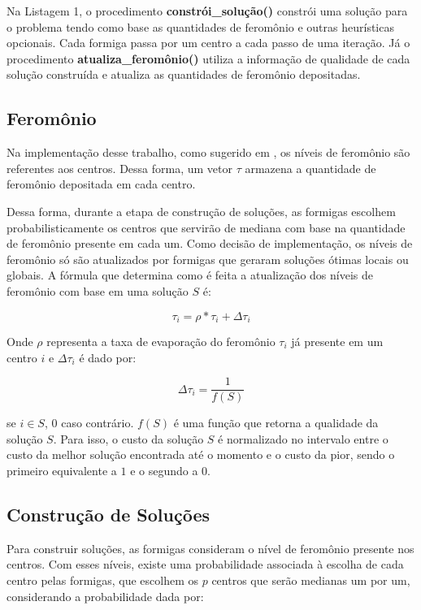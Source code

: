 \documentclass[12pt]{article}
\begin{document}
Na Listagem 1, o procedimento \textbf{constrói\_solução()} constrói uma solução para o problema tendo
como base as quantidades de feromônio e outras heurísticas opcionais. Cada formiga passa por um centro
a cada passo de uma iteração. Já o procedimento \textbf{atualiza\_feromônio()} utiliza a informação 
de qualidade de cada solução construída e atualiza as quantidades de feromônio depositadas.

\subsection{Feromônio}

Na implementação desse trabalho, como sugerido em \cite{DBLP:journals/informaticaSI/FrancaZC05}, os níveis
de feromônio são referentes aos centros. Dessa forma, um vetor $ \tau $ armazena a quantidade de feromônio
depositada em cada centro.

Dessa forma, durante a etapa de construção de soluções, as formigas escolhem probabilisticamente os centros
que servirão de mediana com base na quantidade de feromônio presente em cada um. Como decisão de implementação,
os níveis de feromônio só são atualizados por formigas que geraram soluções ótimas locais ou globais. A fórmula
que determina como é feita a atualização dos níveis de feromônio com base em uma solução $ S $ é:

\begin{displaymath}
 \tau_i = \rho * \tau_i + \Delta\tau_i
\end{displaymath}

Onde $ \rho $ representa a taxa de evaporação do feromônio $ \tau_i $ já presente em um centro $ i $ e
$ \Delta\tau_i $ é dado por:

\begin{displaymath}
 \Delta\tau_i = \frac{1}{f(S)} 
\end{displaymath}

se $ i \in S $, $ 0 $ caso contrário. $ f(S) $ é uma função que retorna a qualidade da solução $ S $.
Para isso, o custo da solução $ S $ é normalizado no intervalo entre o custo da melhor solução encontrada
até o momento e o custo da pior, sendo o primeiro equivalente a $ 1 $ e o segundo a $ 0 $.

\subsection{Construção de Soluções}

Para construir soluções, as formigas consideram o nível de feromônio presente nos centros. Com esses níveis,
existe uma probabilidade associada à escolha de cada centro pelas formigas, que escolhem os $ p $ centros
que serão medianas um por um, considerando a probabilidade dada por:
\end{document}
